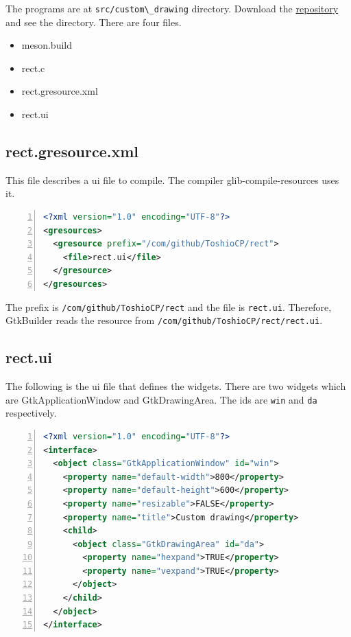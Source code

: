 The programs are at \passthrough{\lstinline!src/custom\_drawing!}
directory. Download the
\href{https://github.com/ToshioCP/Gtk4-tutorial}{repository} and see the
directory. There are four files.

\begin{itemize}
\tightlist
\item
  meson.build
\item
  rect.c
\item
  rect.gresource.xml
\item
  rect.ui
\end{itemize}

\subsection{rect.gresource.xml}\label{rect.gresource.xml}

This file describes a ui file to compile. The compiler
glib-compile-resources uses it.

\begin{lstlisting}[language=XML, numbers=left]
<?xml version="1.0" encoding="UTF-8"?>
<gresources>
  <gresource prefix="/com/github/ToshioCP/rect">
    <file>rect.ui</file>
  </gresource>
</gresources>
\end{lstlisting}

The prefix is \passthrough{\lstinline!/com/github/ToshioCP/rect!} and
the file is \passthrough{\lstinline!rect.ui!}. Therefore, GtkBuilder
reads the resource from
\passthrough{\lstinline!/com/github/ToshioCP/rect/rect.ui!}.

\subsection{rect.ui}\label{rect.ui}

The following is the ui file that defines the widgets. There are two
widgets which are GtkApplicationWindow and GtkDrawingArea. The ids are
\passthrough{\lstinline!win!} and \passthrough{\lstinline!da!}
respectively.

\begin{lstlisting}[language=XML, numbers=left]
<?xml version="1.0" encoding="UTF-8"?>
<interface>
  <object class="GtkApplicationWindow" id="win">
    <property name="default-width">800</property>
    <property name="default-height">600</property>
    <property name="resizable">FALSE</property>
    <property name="title">Custom drawing</property>
    <child>
      <object class="GtkDrawingArea" id="da">
        <property name="hexpand">TRUE</property>
        <property name="vexpand">TRUE</property>
      </object>
    </child>
  </object>
</interface>
\end{lstlisting}

